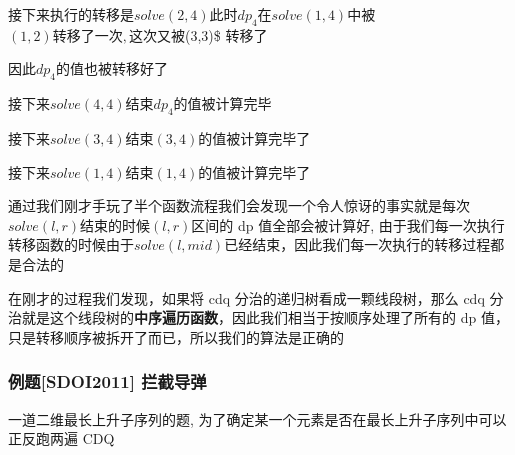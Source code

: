接下来执行的转移是$solve(2,4)$此时$dp_{4}$在$solve(1,4)$中被$(1,2)转移了一次,这次又被$(3,3)\$ 转移了

因此$dp_{4}$的值也被转移好了

接下来$solve(4,4)$结束$dp_{4}$的值被计算完毕

接下来$solve(3,4)$结束$(3,4)$的值被计算完毕了

接下来$solve(1,4)$结束$(1,4)$的值被计算完毕了

通过我们刚才手玩了半个函数流程我们会发现一个令人惊讶的事实就是每次$solve(l,r)$结束的时候$(l,r)$区间的 dp 值全部会被计算好, 由于我们每一次执行转移函数的时候由于$solve(l,mid)$已经结束，因此我们每一次执行的转移过程都是合法的

在刚才的过程我们发现，如果将 cdq 分治的递归树看成一颗线段树，那么 cdq 分治就是这个线段树的\textbf{中序遍历函数}，因此我们相当于按顺序处理了所有的 dp 值，只是转移顺序被拆开了而已，所以我们的算法是正确的

\hr

\subsubsection{例题[SDOI2011] 拦截导弹}

一道二维最长上升子序列的题, 为了确定某一个元素是否在最长上升子序列中可以正反跑两遍 CDQ

